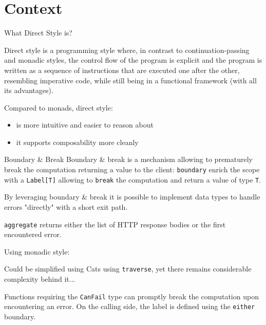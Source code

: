 \documentclass[aspectratio=1610,xcolor=dvipsnames]{beamer}
\begin{document}
\section{Context}
\begin{frame}{What Direct Style is?}
  \begin{block}{}
    Direct style is a programming style where, in contrast to continuation-passing and monadic styles, the control flow of the program is explicit and the program is written as a sequence of instructions that are executed one after the other, resembling imperative code, while still being in a functional framework (with all its advantages).
  \end{block}
  Compared to monads, direct style:
  \begin{itemize}
    \item is more intuitive and easier to reason about
    \item it supports composability more cleanly
  \end{itemize}
\end{frame}
%
\begin{frame}{Boundary \& Break \cite{scalar-gears}}
  Boundary \& break is a mechanism allowing to prematurely break the computation returning a value to the client: \texttt{boundary} enrich the scope with a \texttt{Label[T]} allowing to \texttt{break} the computation and return a value of type \texttt{T}.
  
  By leveraging boundary \& break it is possible to implement data types to handle errors "directly" with a short exit path. 
\end{frame}
%
\begin{frame}
  \footnotesize
  \texttt{aggregate} returns either the list of HTTP response bodies or the first encountered error.

  

  \pause
  Using monadic style:
  

  \pause
  Could be simplified using Cats using \texttt{traverse}, yet there remains considerable complexity behind it...
  
\end{frame}
%
\begin{frame}
  \small
  Functions requiring the \texttt{CanFail} type can promptly break the computation upon encountering an error.
  On the calling side, the label is defined using the \texttt{either} boundary.
  
  
\end{frame}
\end{document}

